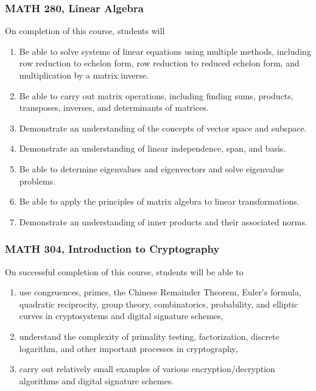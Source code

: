 \documentclass[11pt]{article}
\newenvironment{alphalist}{
\begin{enumerate}[label=(\arabic*),widest=107 ,leftmargin=25pt, itemsep=0pt]}
{\end{enumerate}}
\begin{document}
\subsubsection{MATH 280, Linear Algebra}
On completion of this course, students will
\begin{alphalist}
\item Be able to solve systems of linear equations using multiple methods, including row reduction to echelon form, row reduction to reduced 
echelon form, and multiplication by a matrix inverse.
\item Be able to carry out matrix operations, including finding sums, products, transposes, 
inverses,  and determinants of matrices.
\item Demonstrate an understanding of the concepts of vector space and subspace.
\item Demonstrate an understanding of linear independence, span, and basis.
\item Be able to determine eigenvalues and eigenvectors and solve eigenvalue problems.
\item Be able to apply the principles of matrix algebra to linear transformations.
\item Demonstrate an understanding of inner products and their associated norms.
\end{alphalist} 

\subsubsection{MATH 304, Introduction to Cryptography}

On successful completion of this course, students will be able to
\begin{alphalist}
\item use congruences, primes, the Chinese Remainder Theorem, Euler’s formula, quadratic reciprocity, group
theory, combinatorics, probability, and elliptic curves in cryptosystems and digital signature schemes,

\item understand the complexity of primality testing, factorization, discrete logarithm, and other important processes
in cryptography,

\item carry out relatively small examples of various encryption/decryption algorithms and digital signature schemes.

\end{alphalist}
\end{document}
